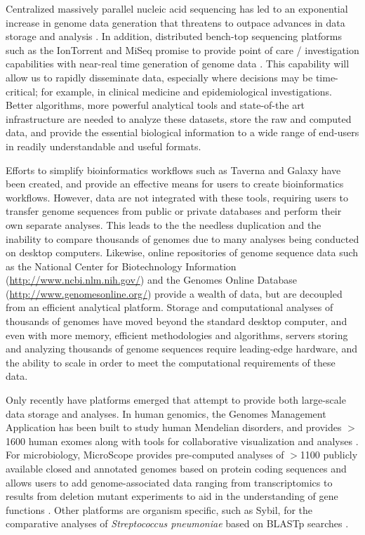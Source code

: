 \documentclass[a4paper,twoside]{article}
\begin{document}
{\noindent Centralized massively parallel nucleic acid sequencing has led to an exponential increase in genome data generation that threatens to outpace advances in data storage and analysis \cite{kahn_future_2011,teeling_current_2012}. In addition, distributed bench-top sequencing platforms such as the IonTorrent and MiSeq promise to provide point of care / investigation capabilities with near-real time generation of genome data \cite{loman_performance_2012}. This capability will allow us to rapidly disseminate data, especially where decisions may be time-critical; for example, in clinical medicine and epidemiological investigations. Better algorithms, more powerful analytical tools and state-of-the art infrastructure are needed to analyze these datasets, store the raw and computed data, and provide the essential biological information to a wide range of end-users in readily understandable and useful formats.

Efforts to simplify bioinformatics workflows such as Taverna \cite{lanzen_taverna_2008} and Galaxy \cite{goecks_galaxy:_2010} have been created, and provide an effective means for users to create bioinformatics workflows. However, data are not integrated with these tools, requiring users to transfer genome sequences from public or private databases and perform their own separate analyses. This leads to the the needless duplication and the inability to compare thousands of genomes due to many analyses being conducted on desktop computers. Likewise, online repositories of genome sequence data such as the National Center for Biotechnology Information (\url{http://www.ncbi.nlm.nih.gov/}) and the Genomes Online Database (\url{http://www.genomesonline.org/}) provide a wealth of data, but are decoupled from an efficient analytical platform. Storage and computational analyses of thousands of genomes have moved beyond the standard desktop computer, and even with more memory, efficient methodologies and algorithms, servers storing and analyzing thousands of genome sequences require leading-edge hardware, and the ability to scale in order to meet the computational requirements of these data.

Only recently have platforms emerged that attempt to provide both large-scale data storage and analyses. In human genomics, the Genomes Management Application has been built to study human Mendelian disorders, and provides $>$1600 human exomes along with tools for collaborative visualization and analyses \cite{gonzalez_genomes_2013}. For microbiology, MicroScope provides pre-computed analyses of $>$1100 publicly available closed and annotated genomes based on protein coding sequences and allows users to add genome-associated data ranging from transcriptomics to results from deletion mutant experiments to aid in the understanding of gene functions \cite{vallenet_microscope--integrated_2012}. Other platforms are organism specific, such as Sybil, for the comparative analyses of \textit{Streptococcus pneumoniae} based on BLASTp searches \cite{riley_using_2012}.

}
\end{document}
